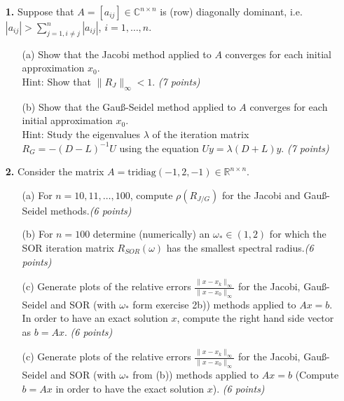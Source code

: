 \documentclass[10pt]{report}
\begin{document}
\begin{enumerate}
    
  \item[\textbf{1.}]Suppose that $A=[a_{ij}]\in\mathbb{C}^{n\times n}$ is  (row) diagonally dominant, i.e. $|a_{ij}|>\sum_{j=1,i\neq j}^n|a_{ij}|$, $i=1,\ldots,n$.
  \begin{enumerate}
    \item[(a)] Show that the Jacobi method applied to $A$ converges for each
    initial approximation $x_0$.\\ 
    Hint: Show that $\|R_J\|_{\infty}<1$. \textit{(7 points)}

    \item[(b)] Show that the Gau\ss-Seidel method applied to $A$ converges for
      each initial approximation $x_0$.\\ 
      Hint: Study the eigenvalues $\lambda$ of the iteration matrix
      $R_G=-(D-L)^{-1}U$ using the equation $Uy=\lambda(D+L)y$. 
      \textit{(7 points)}
  \end{enumerate}

\vspace{0.1cm} 

\item[\textbf{2.}] Consider the matrix $A=\text{tridiag}(-1,2,-1)\in\mathbb{R}^{n\times n}$.
  \begin{enumerate}
    \item[(a)] For  $n=10,11,\ldots,100$, compute $\rho(R_{J/G})$ for the Jacobi and Gau\ss-Seidel methods.\textit{(6 points)}

    \item[(b)] For $n=100$ determine (numerically) an $\omega_*\in(1,2)$ for which the SOR iteration matrix $R_{SOR}(\omega)$ has the smallest spectral radius.\textit{(6 points)}


    \item[(c)] Generate plots of the relative errors $\frac{\|x-x_k\|_{\infty}}{\|x-x_0\|_{\infty}}$ for the Jacobi, Gau\ss-Seidel and SOR (with $\omega_*$ form exercise 2b)) methods applied to $Ax=b$. In order to have an exact solution $x$, compute the right hand side vector as $b=Ax$.  \textit{(6 points)} 

    \item[(c)] Generate plots of the relative errors $\frac{\|x-x_k\|_{\infty}}{\|x-x_0\|_{\infty}}$ for the Jacobi, Gau\ss-Seidel and SOR (with $\omega_*$ from (b)) methods applied to $Ax=b$ (Compute $b=Ax$ in order to have the exact solution $x$).  \textit{(6 points)} 
\end{enumerate}


\end{enumerate}
\end{document}
